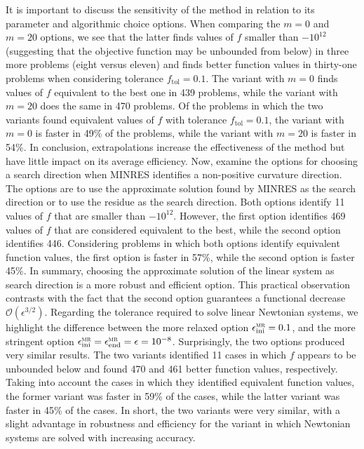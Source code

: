 \documentclass[11pt]{article}
\newcommand{\ftol}{f_{\mathrm{tol}}}
\begin{document}
It is important to discuss the sensitivity of the method in relation to its parameter and algorithmic choice options. When comparing the $m=0$ and $m=20$ options, we see that the latter finds values of $f$ smaller than $-10^{12}$ (suggesting that the objective function may be unbounded from below) in three more problems (eight versus eleven) and finds better function values in thirty-one problems when considering tolerance $\ftol=0.1$. The variant with $m = 0$ finds values of $f$ equivalent to the best one in 439 problems, while the variant with $m = 20$ does the same in 470 problems. Of the problems in which the two variants found equivalent values of $f$ with tolerance $\ftol = 0.1$, the variant with $m = 0$ is faster in 49\% of the problems, while the variant with $m = 20$ is faster in 54\%. In conclusion, extrapolations increase the effectiveness of the method but have little impact on its average efficiency. Now, examine the options for choosing a search direction when MINRES identifies a non-positive curvature direction. The options are to use the approximate solution found by MINRES as the search direction or to use the residue as the search direction. Both options identify 11 values of $f$ that are smaller than $-10^{12}$. However, the first option identifies 469 values of $f$ that are considered equivalent to the best, while the second option identifies 446. Considering problems in which both options identify equivalent function values, the first option is faster in 57\%, while the second option is faster 45\%. In summary, choosing the approximate solution of the linear system as search direction is a more robust and efficient option. This practical observation contrasts with the fact that the second option guarantees a functional decrease $\mathcal{O}(\epsilon^{3/2})$. Regarding the tolerance required to solve linear Newtonian systems, we highlight the difference between the more relaxed option $\epsilon^{\mathrm{\textsc{mr}}}_{\mathrm{ini}}=0.1$, and the more stringent option $\epsilon^{\mathrm{\textsc{mr}}}_{\mathrm{ini}}=\epsilon^{\mathrm{\textsc{mr}}}_{\mathrm{end}}=\epsilon=10^{-8}$. Surprisingly, the two options produced very similar results. The two variants identified 11 cases in which $f$ appears to be unbounded below and found 470 and 461 better function values, respectively. Taking into account the cases in which they identified equivalent function values, the former variant was faster in 59\% of the cases, while the latter variant was faster in 45\% of the cases. In short, the two variants were very similar, with a slight advantage in robustness and efficiency for the variant in which Newtonian systems are solved with increasing accuracy.
\end{document}
